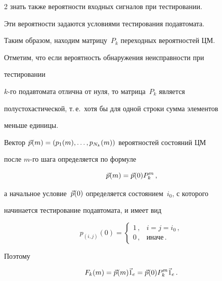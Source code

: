 \begin{multicols}{2}
знать также вероятности входных сигналов при тестировании.


Эти вероятности задаются условиями тестирования подавтомата.





Таким образом, находим мат\-ри\-цу~$P_k$ переходных вероятностей ЦМ.


Отметим, что если вероятность обнаружения неисправности при


тестировании\linebreak


$k$-го подавтомата отлична от нуля, то мат\-ри\-ца~$P_k$ является


полустохастической, т.\,е.\ хотя бы для одной строки сумма элементов


меньше единицы.





 Вектор $\vec p(m)=(p_1(m),\ldots,p_{N_k}(m))$ вероятностей состояний ЦМ


после $m$-го шага определяется по формуле


$$


\v p(m) = \v p(0) P^m_k\,,


$$


а начальное условие~$\vec p(0)$ определяется со\-сто\-яни\-ем~$i_0$, с которого


начинается тестирование подавтомата, и имеет вид


$$


p_{(i,j)}(0)


=


\begin{cases}


1\,, & i=j=i_0\,, \\


0\,, & \text{иначе}\,.


\end{cases}


$$


Поэтому





\vspace*{-2pt}





\noindent


$$


F_k(m)=\v p(m) \v 1_e = \v p(0) P_k^{m} \v 1_e\,.


$$









\end{multicols}
